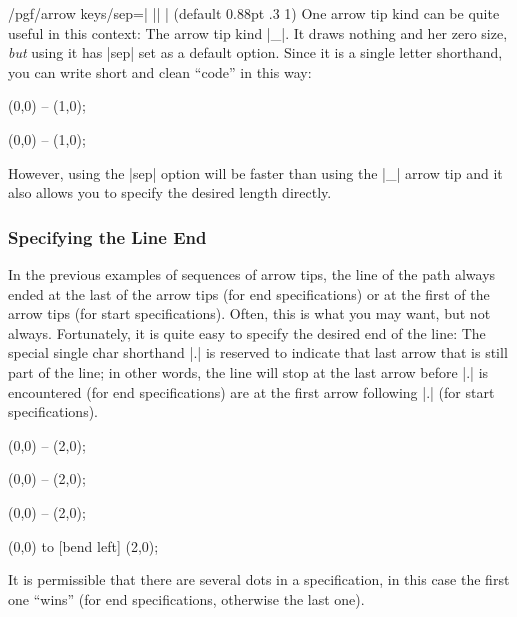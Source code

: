 \begin{key}{/pgf/arrow keys/sep=| || | (default 0.88pt .3 1)}
  One arrow tip kind can be quite useful in this context: The arrow
  tip kind |_|. It draws nothing and her zero size, \emph{but} using
  it has |sep| set as a default option. Since it is a single letter
  shorthand, you can write short and clean ``code'' in this way:
\begin{codeexample}[]  
\tikz \draw [->_>] (0,0) -- (1,0);
\end{codeexample}
\begin{codeexample}[]  
\tikz \draw [->__>] (0,0) -- (1,0);
\end{codeexample}
  However, using the |sep| option will be faster than using the |_|
  arrow tip and it also allows you to specify the desired length
  directly. 
\end{key}



\subsubsection{Specifying the Line End}

In the previous examples of sequences of arrow tips, the line of the
path always ended at the last of the arrow tips (for end
specifications) or at the first of the arrow tips (for start
specifications). Often, this is what you may want, but not
always. Fortunately, it is quite easy to specify the desired end of
the line: The special single char shorthand |.| is reserved to
indicate that last arrow that is still part of the line; in other
words, the line will stop at the last arrow before |.| is encountered
(for end specifications) are at the first arrow following |.| (for
start specifications).
\begin{codeexample}[]
 \draw [<<<->>>] (0,0) -- (2,0);
\end{codeexample}
\begin{codeexample}[]
 \draw [<.<<->.>>] (0,0) -- (2,0);
\end{codeexample}
\begin{codeexample}[]
 \draw [<<.<-.>>>] (0,0) -- (2,0);
\end{codeexample}
\begin{codeexample}[]
 \draw [<<.<->.>>] (0,0) to [bend left] (2,0);
\end{codeexample}

It is permissible that there are several dots in a specification, in
this case the first one ``wins'' (for end specifications, otherwise
the last one).

